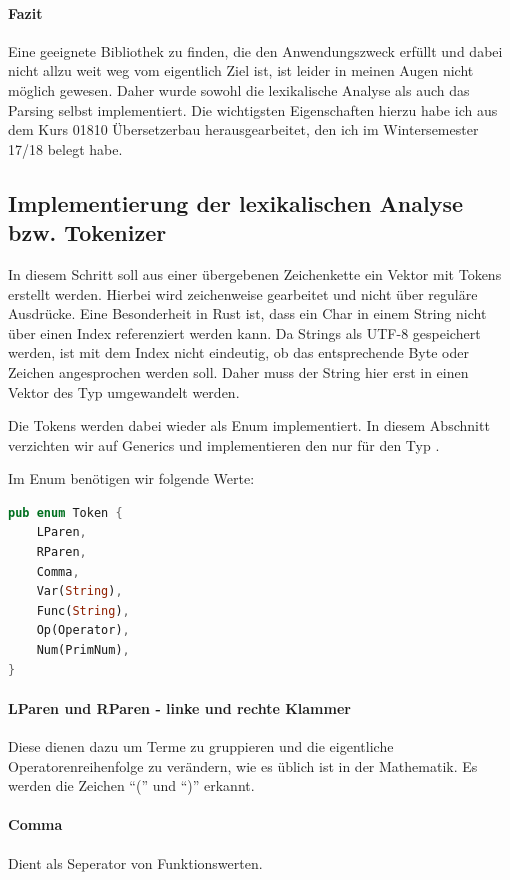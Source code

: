 \documentclass[11pt,a4paper, ngerman]{article}
\begin{document}
\paragraph{Fazit} Eine geeignete Bibliothek zu finden, die den Anwendungszweck erfüllt und dabei nicht allzu weit weg vom eigentlich Ziel ist, ist leider in meinen Augen nicht möglich gewesen. Daher wurde sowohl die lexikalische Analyse als auch das Parsing selbst implementiert. Die wichtigsten Eigenschaften hierzu habe ich aus dem Kurs 01810 Übersetzerbau herausgearbeitet, den ich im Wintersemester 17/18 belegt habe.

\subsection{Implementierung der lexikalischen Analyse bzw. Tokenizer} In diesem Schritt soll aus einer übergebenen Zeichenkette ein Vektor mit Tokens erstellt werden. Hierbei wird zeichenweise gearbeitet und nicht über reguläre Ausdrücke. Eine Besonderheit in Rust ist, dass ein Char in einem String nicht über einen Index referenziert werden kann. Da Strings als UTF-8 gespeichert werden, ist mit dem Index nicht eindeutig, ob das entsprechende Byte oder Zeichen angesprochen werden soll. Daher muss der String hier erst in einen Vektor des Typ  umgewandelt werden.

Die Tokens werden dabei wieder als Enum implementiert. In diesem Abschnitt verzichten wir auf Generics und implementieren den  nur für den Typ .

Im Enum benötigen wir folgende Werte:
\begin{lstlisting}[language=rust, caption={Enum Token}]
pub enum Token {
    LParen,
    RParen,
    Comma,
    Var(String),
    Func(String),
    Op(Operator),
    Num(PrimNum),
}
\end{lstlisting}

\paragraph{LParen und RParen - linke und rechte Klammer} Diese dienen dazu um Terme zu gruppieren und die eigentliche Operatorenreihenfolge zu verändern, wie es üblich ist in der Mathematik. Es werden die Zeichen ``('' und ``)'' erkannt.

\paragraph{Comma} Dient als Seperator von Funktionswerten.
\end{document}
